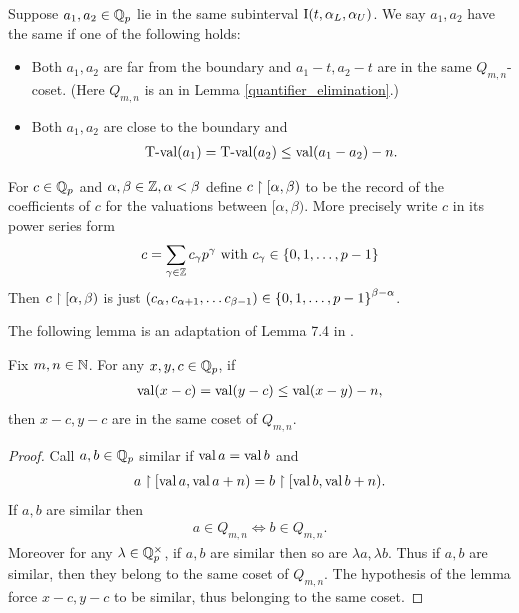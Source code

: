 \begin{Definition}
  Suppose $a_1, a_2 \in \mathbb{Q}_p$ lie in the same subinterval $\operatorname{I}(t, \alpha_L, \alpha_U)$.
  We say $a_1, a_2$ have the same  if one of the following holds:
  \begin{itemize}
  \item Both $a_1, a_2$ are far from the boundary and $a_1 - t, a_2 - t$ are in the same $Q_{m,n}$-coset.
    (Here $Q_{m,n}$ is an in Lemma \ref{quantifier_elimination}.)
  \item Both $a_1, a_2$ are close to the boundary and 
    \begin{align*}
	  \operatorname{T-val}(a_1) = \operatorname{T-val}(a_2) \leq \operatorname{val}(a_1 - a_2) - n.
    \end{align*}
  \end{itemize}      
\end{Definition}


\begin{Definition}
	For $c \in \mathbb{Q}_p$ and $\alpha, \beta \in \mathbb{Z}, \alpha < \beta$ define $c \upharpoonright [\alpha, \beta)$
  to be the record of the coefficients of $c$ for the valuations between $[\alpha, \beta)$.
  More precisely write $c$ in its power series form
  \begin{align*}
    c = \sum_{\gamma \in \mathbb{Z}} c_\gamma p^\gamma \text{ with } c_\gamma \in \left\{0,1, \ldots, p-1\right\}
  \end{align*}
  Then $c \upharpoonright [\alpha, \beta)$ is just $(c_\alpha, c_{\alpha+1}, \ldots c_{\beta - 1}) \in \left\{0,1, \ldots, p-1\right\}^{\beta - \alpha}$.
\end{Definition}

The following lemma is an adaptation of Lemma 7.4 in \cite{density}.
\begin{Lemma} \label{distance}
  Fix $m,n \in \mathbb{N}$.
  For any $x,y,c \in \mathbb{Q}_p$, if
  \begin{align*}
    \operatorname{val} (x - c) = \operatorname{val} (y - c) \leq \operatorname{val} (x - y) - n,
  \end{align*}
  then $x - c, y - c$ are in the same coset of $Q_{m,n}$.
\end{Lemma}
\begin{proof}
  Call $a,b \in \mathbb{Q}_p$ similar if $\operatorname{val} a = \operatorname{val} b$ and
  \begin{align*}
    a \upharpoonright [\operatorname{val} a, \operatorname{val} a + n) = b \upharpoonright [\operatorname{val} b, \operatorname{val} b + n).
  \end{align*}
  If $a,b$ are similar then
  \begin{align*}
    a \in Q_{m,n} \iff b \in Q_{m,n}.
  \end{align*}
  Moreover for any $\lambda \in \mathbb{Q}_p^\times$, if $a,b$ are similar then so are $\lambda a, \lambda b$.
  Thus if $a,b$ are similar, then they belong to the same coset of $Q_{m,n}$.
  The hypothesis of the lemma force $x - c, y - c$ to be similar, thus belonging to the same coset.
\end{proof} 


